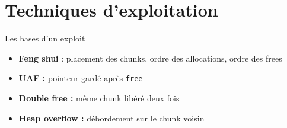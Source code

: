 \documentclass[10pt]{beamer}
\begin{document}
\section{Techniques d'exploitation}

\begin{frame}{Les bases d'un exploit}

    \begin{itemize}
        \item \textbf{Feng shui} : placement des chunks, ordre des allocations, ordre des frees
        \item \textbf{UAF :} pointeur gardé après \texttt{free}
        \item \textbf{Double free :} même chunk libéré deux fois
        \item \textbf{Heap overflow :} débordement sur le chunk voisin
    \end{itemize}

\end{frame}
\end{document}
